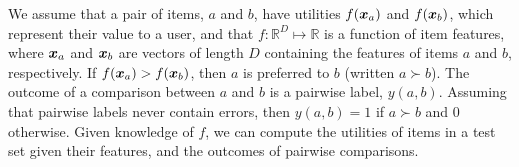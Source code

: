 
We assume that a pair of items, $a$ and $b$, have utilities
$f(\boldsymbol x_a)$ and $f(\boldsymbol x_b)$, which represent their value to a user,
and that $f: \mathbb{R}^D \mapsto \mathbb{R}$ 
is a function of item features, where $\boldsymbol x_a$ and $\boldsymbol x_b$ are vectors 
of length $D$ containing the features of items $a$ and $b$, respectively.
If $f(\boldsymbol x_a) > f(\boldsymbol x_b)$, then $a$ is preferred to $b$ (written $a \succ b$).
The outcome of a comparison between $a$ and $b$ is 
a pairwise label, $y(a, b)$.
Assuming that pairwise labels never contain errors,
then $y(a, b)=1$ if $a \succ b$ and $0$ otherwise.
Given knowledge of $f$, we can compute the utilities 
of items in a test set given their features, and the outcomes of pairwise comparisons.

